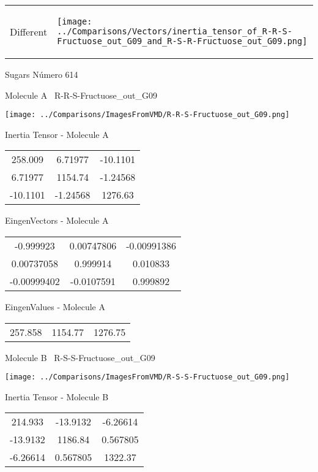 \vtab[-5mm]
\begin{tabular}{*{2}{m{}}}
\begin{center}
\textcolor{NavyBlue}{\Large Different}
\end{center}
&
\begin{center}
\texttt{[image: ../Comparisons/Vectors/inertia\_tensor\_of\_R-R-S-Fructuose\_out\_G09\_and\_R-S-R-Fructuose\_out\_G09.png]}
\end{center}
\end{tabular}

 \newpage

\vtab[-3cm]
\begin{center}
{\large Sugars \tab Número 614}
\end{center}
\begin{multicols}{2}
\begin{center}

Molecule A \
R-R-S-Fructuose\_out\_G09

\texttt{[image: ../Comparisons/ImagesFromVMD/R-R-S-Fructuose\_out\_G09.png]}

Inertia Tensor - Molecule A \\
\begin{tabular}{|c c c|}
258.009	 & 	6.71977	 & 	-10.1101	 \\
6.71977	 & 	1154.74	 & 	-1.24568	 \\
-10.1101	 & 	-1.24568	 & 	1276.63
\end{tabular}

\vtab
 EingenVectors - Molecule A     \\
\begin{tabular}{|c c c|}
-0.999923	 & 	0.00747806	 & 	-0.00991386	 \\
0.00737058	 & 	0.999914	 & 	0.010833	 \\
-0.00999402	 & 	-0.0107591	 & 	0.999892
\end{tabular}

\vtab
 EingenValues - Molecule A     \\
\begin{tabular}{|c c c|}
257.858	 & 	1154.77	 & 	1276.75	 \\
\end{tabular}
\columnbreak

Molecule B \
R-S-S-Fructuose\_out\_G09

\texttt{[image: ../Comparisons/ImagesFromVMD/R-S-S-Fructuose\_out\_G09.png]}

Inertia Tensor - Molecule B \\
\begin{tabular}{|c c c|}
214.933	 & 	-13.9132	 & 	-6.26614	 \\
-13.9132	 & 	1186.84	 & 	0.567805	 \\
-6.26614	 & 	0.567805	 & 	1322.37
\end{tabular}


\end{center}
\end{multicols}
